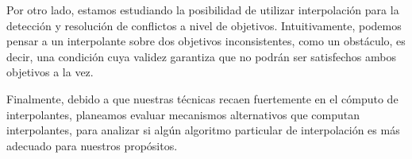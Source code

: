 Por otro lado, estamos estudiando la posibilidad de utilizar interpolaci\'on para la detecci\'on y resoluci\'on de conflictos a nivel de objetivos. Intuitivamente, podemos pensar a un interpolante sobre dos objetivos inconsistentes, como un obst\'aculo, es decir, una condici\'on cuya validez garantiza que no podr\'an ser satisfechos ambos objetivos a la vez.

Finalmente, debido a que nuestras t\'ecnicas recaen fuertemente en el c\'omputo de interpolantes, planeamos evaluar mecanismos alternativos que computan interpolantes, para analizar si alg\'un algoritmo particular de interpolaci\'on es m\'as adecuado para nuestros prop\'ositos.



